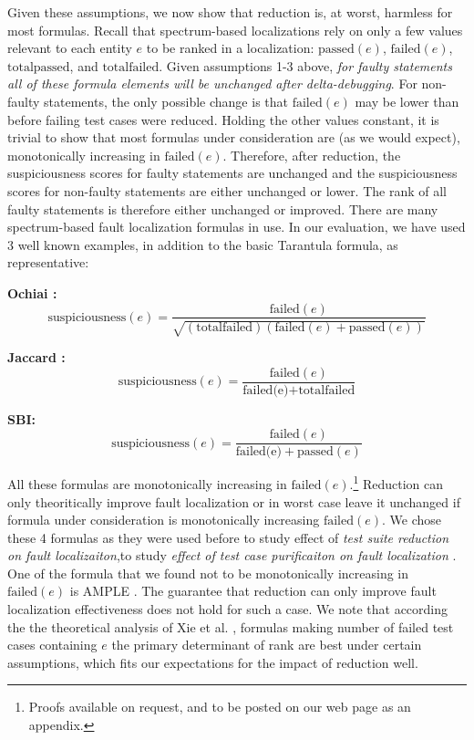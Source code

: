 Given these assumptions, we now show that reduction is, at worst,
harmless for most formulas.  Recall that spectrum-based localizations
rely on only a few values relevant to each entity $e$ to be ranked in
a localization: $\text{passed}(e)$, $\text{failed}(e)$,
$\text{totalpassed}$, and $\text{totalfailed}$.  Given assumptions 1-3
above, \emph{for faulty statements all of these formula elements will
be unchanged after delta-debugging}.  For non-faulty statements, the
only possible change is that $ \text{failed}(e)$ may be lower than
before failing test cases were reduced. Holding the other values
constant, it is trivial to show that most formulas under consideration
are (as we would expect), monotonically increasing in
$\text{failed}(e)$.  Therefore, after reduction, the suspiciousness
scores for faulty statements are unchanged and the suspiciousness
scores for non-faulty statements are either unchanged or lower.  The
rank of all faulty statements is therefore either unchanged or
improved.  There are many spectrum-based fault localization formulas
in use. In our evaluation, we have used 3 well known examples, in
addition to the basic Tarantula \cite{Jones2002} formula, as
representative:

{\bf Ochiai \cite{Ochai}:}
$$ \text{suspiciousness}(e) = \frac{\text{failed}(e)}{\sqrt{(\text{totalfailed}) (\text{failed}(e) + \text{passed}(e))}} $$

{\bf Jaccard \cite{Pinpoint}:}
$$ \text{suspiciousness}(e) = \frac{\text{failed}(e)}{\text{failed(e)} + \text{totalfailed}} $$

{\bf SBI: \cite{EmpirReduce,StatDebug}}
$$ \text{suspiciousness}(e) = \frac{\text{failed}(e)}{\text{failed(e)} + \text{passed}(e)} $$


All these formulas are monotonically increasing in
$\text{failed}(e)$.\footnote{Proofs available on request, and to be posted on our web page as an appendix.} Reduction can only theoritically improve fault localization or in worst case leave it unchanged if formula under consideration is monotonically increasing $\text{failed}(e)$. We chose these 4 formulas as they were used before to study effect of \emph{test suite reduction on fault localizaiton},to study \emph{effect of test case purificaiton on fault localization} \cite{EmpirReduce} \cite{PureTest}. One of the formula that we found not to be monotonically increasing in $\text{failed}(e)$ is AMPLE \cite{AMPLE}. The guarantee that reduction can only improve fault localization effectiveness does not hold for such a case. We note that according the the
theoretical analysis of Xie et al. \cite{Theoretical}, formulas making
number of failed test cases containing $e$ the primary
determinant of rank are best under certain assumptions, which fits
our expectations for the impact of reduction well.



